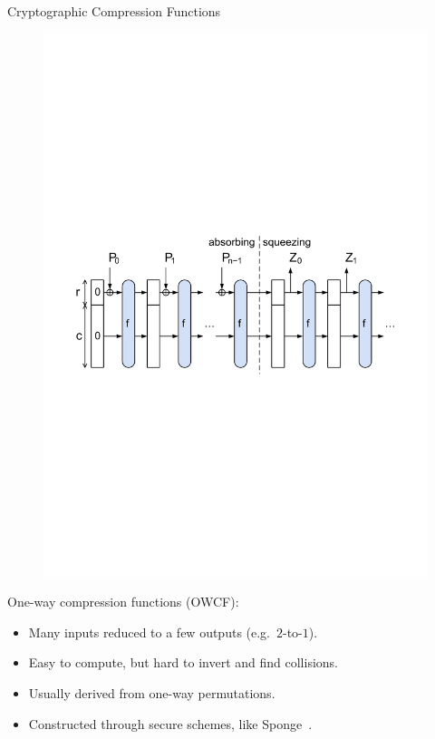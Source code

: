 \documentclass[beamer={10pt,xcolor=dvipsnames},target=mst]{thud}
\begin{document}
\begin{frame}{Cryptographic Compression Functions}
  \begin{figure}
    \centering
    \includegraphics[scale=0.5]{res/SpongeConstruction.pdf}
  \end{figure}
  One-way compression functions (OWCF):
  \begin{itemize}
    \item Many inputs reduced to a few outputs (e.g.\  \(2\)-to-\(1\)).
    \item Easy to compute, but hard to invert and find collisions.
    \item Usually derived from one-way permutations.
    \item Constructed through secure schemes, like Sponge~\cite{BertoniDPA2007}.
  \end{itemize}
\end{frame}
\end{document}
